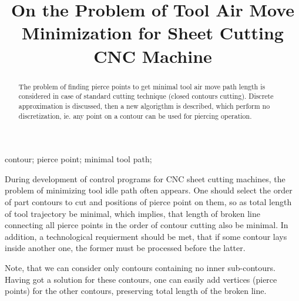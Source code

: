\documentclass{../download/tPRS2e}
\begin{document}
\title{On the Problem of Tool Air Move Minimization for Sheet Cutting CNC Machine}

\author{
}

\maketitle

\begin{abstract}
The problem of finding pierce points to get
minimal tool air move path length is considered
in case of standard cutting technique
(closed contours cutting).
Discrete approximation is discussed,
then a new algorigthm is described,
which perform no discretization,
ie. any point on a contour can be 
used for piercing operation.
\end{abstract}

\begin{keywords}
    contour;
    pierce point;
    minimal tool path;
\end{keywords}

During development of control programs for
CNC sheet cutting machines,
the problem of minimizing tool idle path
often appears.
One should select the order
of part contours to cut
and positions of pierce point on them,
so as total length of tool trajectory be minimal,
which implies,
that length of broken line connecting all
pierce points in the order of contour cutting
also be minimal.
In addition, a technological requierment should be met,
that if some contour lays inside another one,
the former must be processed before the latter.

Note, that we can consider
only contours containing no inner sub-contours.
Having got a solution for these contours,
one can easily add vertices
(pierce points) for the other contours,
preserving total length of the broken line.
\end{document}
